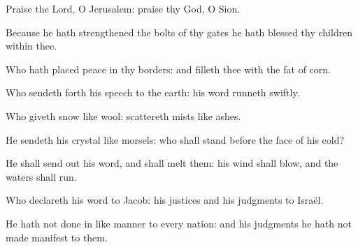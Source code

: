 ﻿\item Praise the Lord, O Je\-ru\-sa\-lem: praise thy God, O Sion. 
\item Because he hath strengthened the bolts of thy gates he hath blessed thy children within thee. 
\item Who hath placed peace in thy borders: and filleth thee with the fat of corn.
\item Who sendeth forth his speech to the earth: his word runneth swiftly.
\item Who giveth snow like wool: scattereth mists like ashes.
\item He sendeth his crystal like morsels: who shall stand before the face of his cold?
\item He shall send out his word, and shall melt them: his wind shall blow, and the waters shall run.
\item Who declareth his word to Jacob: his justices and his judgments to Israël.
\item He hath not done in like manner to every nation: and his judgments he hath not made manifest to them.